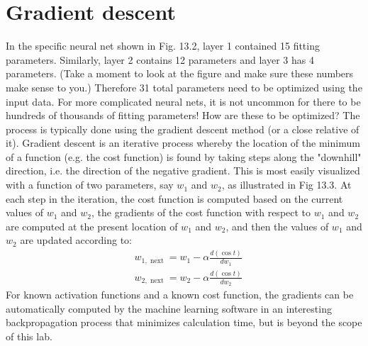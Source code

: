 \documentclass{book}
\theoremstyle{plain}
\theoremstyle{definition}
\numberwithin{exm}{chapter}
\theoremstyle{remark}
\theoremstyle{summary}
\theoremstyle{overview}
\begin{document}
\section*{Gradient descent}
In the specific neural net shown in Fig. 13.2, layer 1 contained 15 fitting parameters. Similarly, layer 2 contains 12 parameters and layer 3 has 4 parameters. (Take a moment to look at the figure and make sure these numbers make sense to you.) Therefore 31 total parameters need to be optimized using the input data. For more complicated neural nets, it is not uncommon for there to be hundreds of thousands of fitting parameters! How are these to be optimized? The process is typically done using the gradient descent method (or a close relative of it).
Gradient descent is an iterative process whereby the location of the minimum of a function (e.g. the cost function) is found by taking steps along the "downhill" direction, i.e. the direction of the negative gradient. This is most easily visualized with a function of two parameters, say $w_{1}$ and $w_{2}$, as illustrated in Fig 13.3.
At each step in the iteration, the cost function is computed based on the current values of $w_{1}$ and $w_{2}$, the gradients of the cost function with respect to $w_{1}$ and $w_{2}$ are computed at the present location of $w_{1}$ and $w_{2}$, and then the values of $w_{1}$ and $w_{2}$ are updated according to:
\begin{equation*}
\begin{aligned}
&w_{1, \text { next }}=w_{1}-\alpha \frac{d(\cos t)}{d w_{1}} \\
&w_{2, \text { next }}=w_{2}-\alpha \frac{d(\cos t)}{d w_{2}}
\end{aligned}
\end{equation*}
For known activation functions and a known cost function, the gradients can be automatically computed by the machine learning software in an interesting backpropagation process that minimizes calculation time, but is beyond the scope of this lab.
\end{document}
